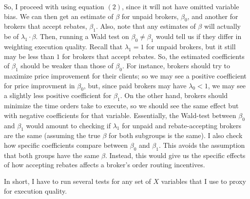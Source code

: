 \documentclass[12pt,a4paper]{article}
\begin{document}
	So, I proceed with using equation $(2)$, since it will not have omitted variable bias. We can then get an estimate of $\beta$ for unpaid brokers, $\beta_0$, and another for brokers that accept rebates, $\beta_1$. Also, note that any estimates of $\beta$ will actually be of $\lambda_1 \cdot \beta$. Then, running a Wald test on $\beta_0 \neq \beta_1$ would tell us if they differ in weighting execution quality. Recall that $\lambda_1 = 1$ for unpaid brokers, but it still may be less than $1$ for brokers that accept rebates. So, the estimated coefficients of $\beta_1$ should be weaker than those of $\beta_0$. For instance, brokers should try to maximize price improvement for their clients; so we may see a positive coefficient for price improvment in $\beta_0$, but, since paid brokers may have $\lambda_0 < 1$, we may see a slightly less positive coefficient for $\beta_1$. On the other hand, brokers should minimize the time orders take to execute, so we should see the same effect but with negative coefficients for that variable. Essentially, the Wald-test between $\beta_0$ and $\beta_1$ would amount to checking if $\lambda_1$ for unpaid and rebate-accepting brokers are the same (assuming the true $\beta$ for both subgroups is the same). I also check how specific coefficients compare between $\beta_0$ and $\beta_1$. This avoids the assumption that both groups have the same $\beta$. Instead, this would give us the specific effects of how accepting rebates affects a broker's order routing incentives. 
	
		In short, I have to run several tests for any set of $X$ variables that I use to proxy for execution quality.
		
\end{document}
